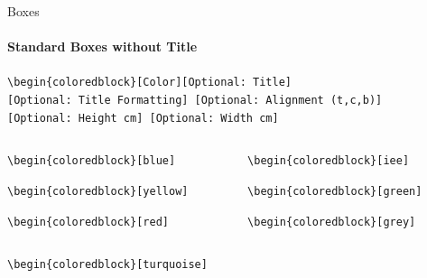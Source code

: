 \documentclass[aspectratio=169]{beamer}
\begin{document}
\begin{frame}{Boxes}
    \framesubtitle{Standard Boxes without Title}

    \begin{coloredblock}[grey]
        \footnotesize\centering\texttt{\textbackslash begin\{coloredblock\}[Color][Optional:~Title][Optional:~Title~Formatting] [Optional:~Alignment (t,c,b)][Optional:~Height~cm] [Optional:~Width~cm]}
    \end{coloredblock}

    \vspace{-1cm}
    \begin{columns}
        \begin{column}{0.49\textwidth}

            \begin{coloredblock}[blue]
                \footnotesize\footnotesize\texttt{\textbackslash begin\{coloredblock\}[blue]}\strut
            \end{coloredblock}
    
            \begin{coloredblock}[yellow]
                \footnotesize\texttt{\textbackslash begin\{coloredblock\}[yellow]}\strut
            \end{coloredblock}
    
            \begin{coloredblock}[red]
                \footnotesize\texttt{\textbackslash begin\{coloredblock\}[red]}\strut
            \end{coloredblock}

        \end{column}
        \begin{column}{0.49\textwidth}
        
            \begin{coloredblock}[iee]
                \footnotesize\texttt{\textbackslash begin\{coloredblock\}[iee]}\strut
            \end{coloredblock}
    
            \begin{coloredblock}[green]
                \footnotesize\texttt{\textbackslash begin\{coloredblock\}[green]}\strut
            \end{coloredblock}
    
            \begin{coloredblock}[grey]
                \footnotesize\texttt{\textbackslash begin\{coloredblock\}[grey]}\strut
            \end{coloredblock}
        
        \end{column}
    \end{columns}

    \centering
    \begin{minipage}[t]{0.49\textwidth}
        \begin{coloredblock}[turquoise]
                \footnotesize\texttt{\textbackslash begin\{coloredblock\}[turquoise]}\strut
        \end{coloredblock}
    \end{minipage}
\end{frame}
\end{document}
